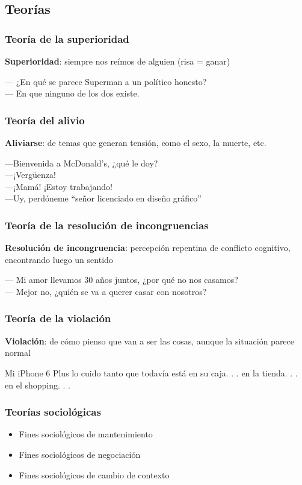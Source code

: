 \subsection{Teorías}
\begin{frame}
    \frametitle{Teoría de la superioridad}

    \textbf{Superioridad}: siempre nos reímos de alguien (risa = ganar)
    \begin{example}
        — ¿En qué se parece Superman a un político honesto? \\
        — En que ninguno de los dos existe.
    \end{example}
\end{frame}

\begin{frame}
\frametitle{Teoría del alivio}
    \textbf{Aliviarse}: de temas que generan tensión, como el sexo, la muerte, etc.
    \begin{example}
        —Bienvenida a McDonald’s, ¿qué le doy?\\
        —¡Vergüenza!\\
        —¡Mamá! ¡Estoy trabajando!\\
        —Uy, perdóneme ``señor licenciado en diseño gráfico''\\
    \end{example}
\end{frame}

\begin{frame}
\frametitle{Teoría de la resolución de incongruencias}
    \textbf{Resolución de incongruencia}: percepción repentina de conflicto cognitivo, encontrando luego un sentido
    \begin{example}
        — Mi amor llevamos 30 años juntos, ¿por qué no nos casamos?\\
        — Mejor no, ¿quién se va a querer casar con nosotros?
    \end{example}
\end{frame}

\begin{frame}
\frametitle{Teoría de la violación}
    \textbf{Violación}: de cómo pienso que van a ser las cosas, aunque la situación parece normal
    \begin{example}
        Mi iPhone 6 Plus lo cuido tanto que todavía está en su caja. . . en la tienda. . . en el shopping. . .
    \end{example}
\end{frame}

\begin{frame}
\frametitle{Teorías sociológicas}
    \begin{itemize}
        \item Fines sociológicos de mantenimiento
        \item Fines sociológicos de negociación
        \item Fines sociológicos de cambio de contexto
    \end{itemize}
\end{frame}

